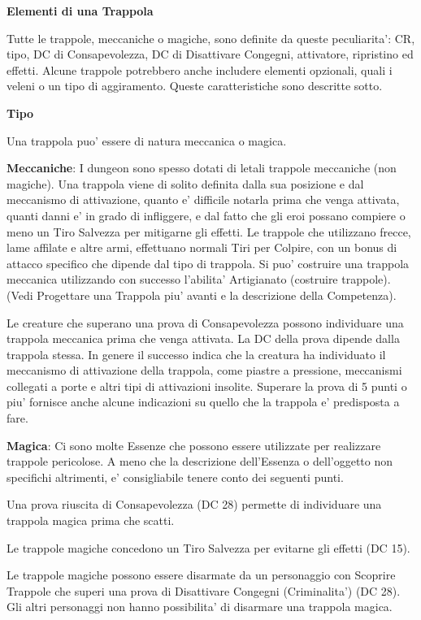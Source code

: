 \documentclass[a4paper,11pt,twoside,openany]{book}
\begin{document}
\textbf{Elementi di una Trappola}

Tutte le trappole, meccaniche o magiche, sono definite da queste peculiarita': CR, tipo, DC di Consapevolezza, DC di Disattivare Congegni, attivatore, ripristino ed effetti. Alcune trappole potrebbero anche includere elementi opzionali, quali i veleni o un tipo di aggiramento. Queste caratteristiche sono descritte sotto.

\textbf{Tipo}

Una trappola puo' essere di natura meccanica o magica.

\textbf{Meccaniche}: I dungeon sono spesso dotati di letali trappole meccaniche (non magiche). Una trappola viene di solito definita dalla sua posizione e dal meccanismo di attivazione, quanto e' difficile notarla prima che venga attivata, quanti danni e' in grado di infliggere, e dal fatto che gli eroi possano compiere o meno un Tiro Salvezza per mitigarne gli effetti. Le trappole che utilizzano frecce, lame affilate e altre armi, effettuano normali Tiri per Colpire, con un bonus di attacco specifico che dipende dal tipo di trappola. Si puo' costruire una trappola meccanica utilizzando con successo l'abilita' Artigianato (costruire trappole). (Vedi Progettare una Trappola piu' avanti e la descrizione della Competenza).

Le creature che superano una prova di Consapevolezza possono individuare una trappola meccanica prima che venga attivata. La DC della prova dipende dalla trappola stessa. In genere il successo indica che la creatura ha individuato il meccanismo di attivazione della trappola, come piastre a pressione, meccanismi collegati a porte e altri tipi di attivazioni insolite. Superare la prova di 5 punti o piu' fornisce anche alcune indicazioni su quello che la trappola e' predisposta a fare.

\textbf{Magica}: Ci sono molte Essenze che possono essere utilizzate per realizzare trappole pericolose. A meno che la descrizione dell'Essenza o dell'oggetto non specifichi altrimenti, e' consigliabile tenere conto dei seguenti punti.

Una prova riuscita di Consapevolezza (DC 28) permette di individuare una trappola magica prima che scatti.

Le trappole magiche concedono un Tiro Salvezza per evitarne gli effetti (DC 15).

Le trappole magiche possono essere disarmate da un personaggio con Scoprire Trappole che superi una prova di Disattivare Congegni (Criminalita') (DC 28). Gli altri personaggi non hanno possibilita' di disarmare una trappola magica.
\end{document}

